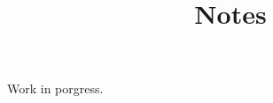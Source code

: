 \documentclass{article}
\begin{document}
\title{Notes}

\maketitle


Work in porgress.
\end{document}
